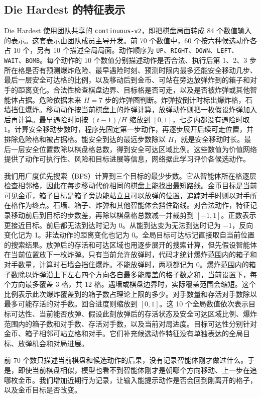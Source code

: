 \documentclass[UTF8,11pt,a4paper,fontset=none]{ctexart}
\begin{document}
\subsection{Die Hardest 的特征表示}
Die Hardest 使用团队共享的 \texttt{continuous-v2}，即把棋盘局面转成 84 个数值输入的表示。这套表示由团队成员主导开发。前 70 个数值中，60 个按六种候选动作各占 10 个，另有 10 个描述全局局面。动作顺序为 \texttt{UP}、\texttt{RIGHT}、\texttt{DOWN}、\texttt{LEFT}、\texttt{WAIT}、\texttt{BOMB}。每个动作的 10 个数值分别描述动作是否合法、执行后第 1、2、3 步所在格是否有预测爆炸危险、最早遇险时刻、预测时限内最多还能安全移动几步、最后一层安全可达格的比例，以及移动后到金币、可站在旁边放弹炸到的箱子和对手的距离变化。合法性检查棋盘边界、目标格是否可走，以及是否被炸弹或其他智能体占据。危险依据未来 $H=7$ 步的炸弹图判断。炸弹按倒计时标出爆炸格，石墙挡住爆炸。移动动作按当前棋盘上的炸弹计算，放弹动作则把一枚假设炸弹加入后再计算。最早遇险时间按 $(t-1)/H$ 缩放到 $[0,1]$，七步内都没有遇险时取 1。计算安全移动步数时，程序先固定第一步动作，再逐步展开后续可走位置，并排除危险格和被占据格。能安全到达的最远步数除以 $H$，就是安全移动时长。最后一层安全位置数除以棋盘格总数，得到安全可达区域比例。这些数值为价值网络提供了动作可执行性、风险和目标进展等信息，网络据此学习评价各候选动作。

我们用广度优先搜索（BFS）计算到三个目标的最少步数。它从智能体所在格逐层检查相邻格，因此在每步移动代价相同的棋盘上能找出最短路线。金币目标是当前可见金币，箱子目标是箱子旁边能站立且可以放弹的位置，追踪对手时则以对手所在格作为终点。石墙、箱子、炸弹和其他智能体会挡住路线。对合法动作，特征记录移动前后到目标的步数差，再除以棋盘格总数减一并裁剪到 $[-1,1]$。正数表示更接近目标。前后都无法到达时记为 0。从能到达变为无法到达时记为 $-1$，反向变化记为 1。非法动作的距离变化也记为 0。全局目标可达标记直接取自当前位置的搜索结果。放弹后的存活和可达区域也用逐步展开的搜索计算，但先假设智能体在当前位置放下一枚炸弹。只有当前允许放弹时，代码才统计爆炸范围内的箱子和对手数量，计算时石墙会挡住爆炸。不能放弹时，两项都记为 0。爆炸范围内的箱子数除以炸弹沿上下左右四个方向各自最多能覆盖的格子数之和，当前设置下，每个方向最多覆盖 3 格，共 12 格。遇墙或棋盘边界时，实际覆盖范围会缩短。这个比例表示此次爆炸覆盖到的箱子数占理论上限的多少。对手数量和存活对手数除以最多可能存活的对手数。回合进度则缩放到 $[0,1]$。这 10 个全局数值依次表示目标可达性、当前能否放弹、假设此刻放弹后的存活状态及安全可达区域比例、爆炸范围内的箱子数和对手数、存活对手数，以及当前对局进度。目标可达性分别针对金币、箱子相邻可站立格和对手。它们补充候选动作特征没有单独表达的全局目标、放弹机会和对局进展。

前 70 个数只描述当前棋盘和候选动作的后果，没有记录智能体刚才做过什么。于是，即使当前棋盘相似，模型也看不到智能体刚才是朝哪个方向移动、上一步在追哪枚金币。我们增加近期行为记录，让输入能提示动作是否会回到刚离开的格子，以及金币目标是否改变。
\end{document}
